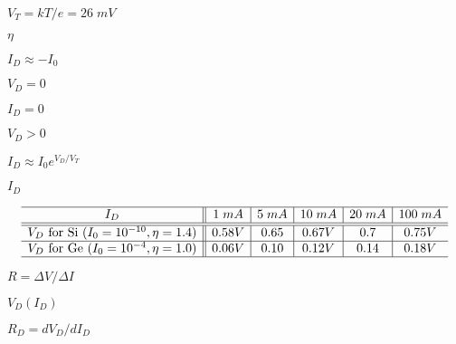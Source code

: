 \documentclass{article}
\def\lthtmlcheckvsize{\ifdim\ht\sizebox<\vsize 
  \ifdim\wd\sizebox<\hsize\expandafter\hfill\fi \expandafter\vfill
  \else\expandafter\vss\fi}%
\begin{document}
{\newpage\clearpage
{}%
$ V_T=kT/e=26\; mV$%
\lthtmlindisplaymathZ
\lthtmlcheckvsize\clearpage}

{\newpage\clearpage
{}%
$ \eta$%
\lthtmlindisplaymathZ
\lthtmlcheckvsize\clearpage}

{\newpage\clearpage
{}%
$ I_D\approx -I_0$%
\lthtmlindisplaymathZ
\lthtmlcheckvsize\clearpage}

{\newpage\clearpage
{}%
$ V_D=0$%
\lthtmlindisplaymathZ
\lthtmlcheckvsize\clearpage}

{\newpage\clearpage
{}%
$ I_D=0$%
\lthtmlindisplaymathZ
\lthtmlcheckvsize\clearpage}

{\newpage\clearpage
{}%
$ V_D>0$%
\lthtmlindisplaymathZ
\lthtmlcheckvsize\clearpage}

{\newpage\clearpage
{}%
$ I_D\approx I_0 e^{V_D/V_T}$%
\lthtmlindisplaymathZ
\lthtmlcheckvsize\clearpage}

{\newpage\clearpage
{}%
$ I_D$%
\lthtmlindisplaymathZ
\lthtmlcheckvsize\clearpage}

{\newpage\clearpage
{}%
\begin{displaymath}\begin{array}{c||c|c|c|c|c} \hline
I_D	& 1 \;mA & 5 \;mA & 10 \;mA & 20 \; mA & 100 \;mA	\\\hline\hline
V_D \mbox{ for Si } (I_0=10^{-10}, \eta=1.4) & 0.58 V & 0.65 & 0.67 V & 0.7 & 0.75 V \\\hline
V_D \mbox{ for Ge } (I_0=10^{-4}, \eta=1.0) & 0.06 V & 0.10 & 0.12 V & 0.14 & 0.18 V \\\hline
\end{array}\end{displaymath}%
\lthtmldisplayZ
\lthtmlcheckvsize\clearpage}

{\newpage\clearpage
{}%
$ R=\Delta V/\Delta I$%
\lthtmlindisplaymathZ
\lthtmlcheckvsize\clearpage}

{\newpage\clearpage
{}%
$ V_D(I_D)$%
\lthtmlindisplaymathZ
\lthtmlcheckvsize\clearpage}

{\newpage\clearpage
{}%
$ R_D=dV_D/dI_D$%
\lthtmlindisplaymathZ
\lthtmlcheckvsize\clearpage}
\end{document}
